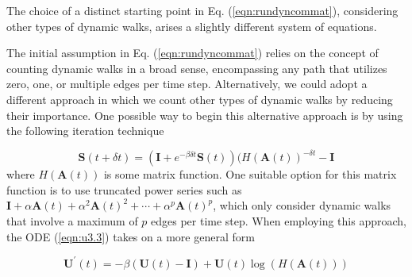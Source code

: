 \begin{highlightedParagraphC}
 
The choice of a distinct starting point in Eq. (\ref{eqn:rundyncommat}), considering other types of dynamic walks, arises a slightly different system of equations.

\end{highlightedParagraphC}

The initial assumption in Eq. (\ref{eqn:rundyncommat}) relies on the concept of counting dynamic walks in a broad sense, encompassing any path that utilizes zero, one, or multiple edges per time step. Alternatively, we could adopt a different approach in which we count other types of dynamic walks by reducing their importance. One possible way to begin this alternative approach is by using the following iteration technique

\begin{equation}
\label{eqn:remarks1}
    \mathbf{S}(t + \delta t) = (\mathbf{I} + e^{-\beta\delta t}\mathbf{S}(t)) (H(\mathbf{A}(t))^{-\delta t} - \mathbf{I}
\end{equation}
where $H(\mathbf{A}(t))$ is some matrix function. One suitable option for this matrix function is to use truncated power series such as $\mathbf{I} + \alpha \mathbf{A}(t) + \alpha^2 \mathbf{A}(t)^2 + \cdots + \alpha^p \mathbf{A}(t)^p$, which only consider dynamic walks that involve a maximum of $p$ edges per time step. When employing this approach, the ODE (\ref{eqn:u3.3}) takes on a more general form 

\begin{equation}
\label{eqn:remarks2}
    \mathbf{U^{\prime}}(t) = -\beta (\mathbf{U}(t) - \mathbf{I}) + \mathbf{U}(t)\log (H(\mathbf{A}(t)))
\end{equation}








